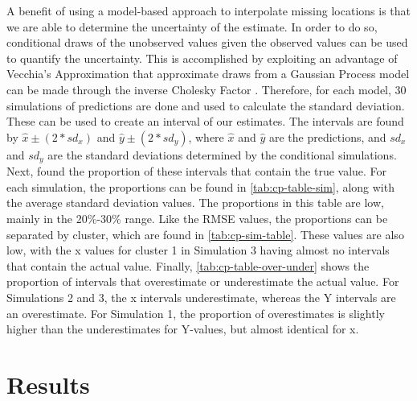 \documentclass[12pt]{article}
\begin{document}
A benefit of using a model-based approach to interpolate missing
locations is that we are able to determine the uncertainty of the
estimate. In order to do so, conditional draws of the unobserved values
given the observed values can be used to quantify the uncertainty. This
is accomplished by exploiting an advantage of Vecchia's Approximation
that approximate draws from a Gaussian Process model can be made through
the inverse Cholesky Factor \citep{guinness_permutation_2018}.
Therefore, for each model, 30 simulations of predictions are done and
used to calculate the standard deviation. These can be used to create an
interval of our estimates. The intervals are found by
\(\hat{x} \pm (2*sd_x)\) and \(\hat{y} \pm (2*sd_y)\), where \(\hat{x}\)
and \(\hat{y}\) are the predictions, and \(sd_x\) and \(sd_y\) are the
standard deviations determined by the conditional simulations. Next,
found the proportion of these intervals that contain the true value. For
each simulation, the proportions can be found in
\cref{tab:cp-table-sim}, along with the average standard deviation
values. The proportions in this table are low, mainly in the 20\%-30\%
range. Like the RMSE values, the proportions can be separated by
cluster, which are found in \cref{tab:cp-sim-table}. These values are
also low, with the x values for cluster 1 in Simulation 3 having almost
no intervals that contain the actual value. Finally,
\cref{tab:cp-table-over-under} shows the proportion of intervals that
overestimate or underestimate the actual value. For Simulations 2 and 3,
the x intervals underestimate, whereas the Y intervals are an
overestimate. For Simulation 1, the proportion of overestimates is
slightly higher than the underestimates for Y-values, but almost
identical for x.

\hypertarget{results}{%
\section{Results}\label{results}}
\end{document}
